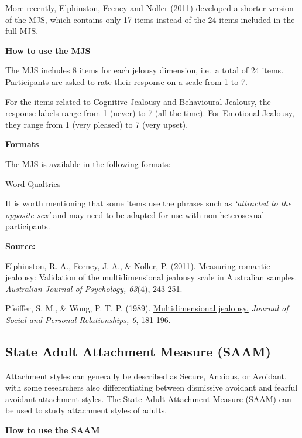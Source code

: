 \documentclass[
]{book}
\begin{document}
More recently, Elphinston, Feeney and Noller (2011) developed a shorter version of the MJS, which contains only 17 items instead of the 24 items included in the full MJS.

\textbf{How to use the MJS}

The MJS includes 8 items for each jelousy dimension, i.e.~a total of 24 items. Participants are asked to rate their response on a scale from 1 to 7.

For the items related to Cognitive Jealousy and Behavioural Jealousy, the response labels range from 1 (never) to 7 (all the time). For Emotional Jealousy, they range from 1 (very pleased) to 7 (very upset).

\textbf{Formats}

The MJS is available in the following formats:

\href{link\%20to\%20file}{Word} \textbar{} \href{link\%20to\%20file}{Qualtrics}

It is worth mentioning that some items use the phrases such as \emph{`attracted to the opposite sex'} and may need to be adapted for use with non-heterosexual participants.

\textbf{Source:}

Elphinston, R. A., Feeney, J. A., \& Noller, P. (2011). \href{https://aps.onlinelibrary.wiley.com/doi/abs/10.1111/j.1742-9536.2011.00026.x}{Measuring romantic jealousy: Validation of the multidimensional jealousy scale in Australian samples.} \emph{Australian Journal of Psychology, 63}(4), 243-251.

Pfeiffer, S. M., \& Wong, P. T. P. (1989). \href{http://www.drpaulwong.com/wp-content/uploads/2018/03/Multidimensional-Jealousy-Scale-Pfeiffer-Wong-1989-Paper.pdf}{Multidimensional jealousy.} \emph{Journal of Social and Personal Relationships, 6}, 181-196.

\hypertarget{state-adult-attachment-measure-saam}{%
\subsection{State Adult Attachment Measure (SAAM)}\label{state-adult-attachment-measure-saam}}

Attachment styles can generally be described as Secure, Anxious, or Avoidant, with some researchers also differentiating between dismissive avoidant and fearful avoidant attachment styles. The State Adult Attachment Measure (SAAM) can be used to study attachment styles of adults.

\textbf{How to use the SAAM}
\end{document}
